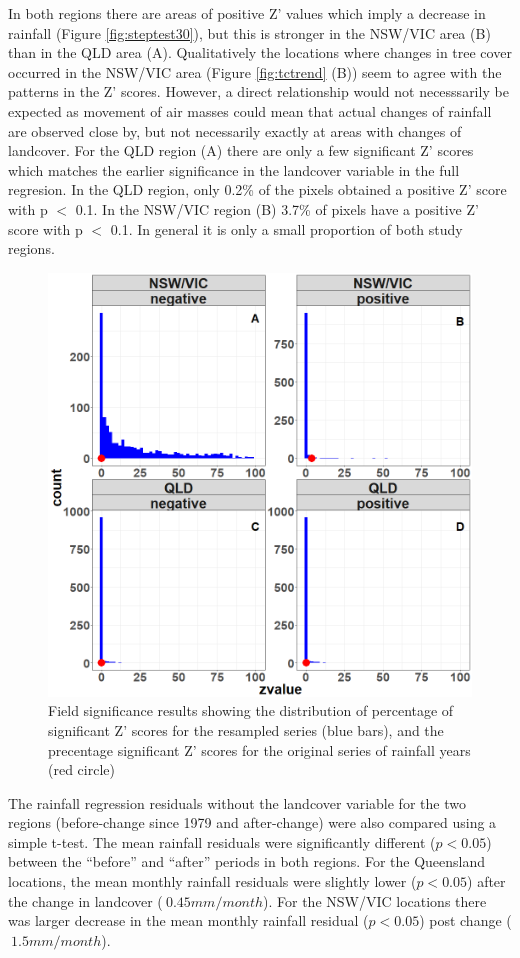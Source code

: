 \documentclass[fleqn,10pt,lineno]{wlpeerj} %
\theoremstyle{definition}
\theoremstyle{definition}
\theoremstyle{definition}
\theoremstyle{remark}
\begin{document}
In both regions there are areas of positive Z' values which imply a
decrease in rainfall (Figure \ref{fig:steptest30}), but this is stronger
in the NSW/VIC area (B) than in the QLD area (A). Qualitatively the
locations where changes in tree cover occurred in the NSW/VIC area
(Figure \ref{fig:tctrend} (B)) seem to agree with the patterns in the Z'
scores. However, a direct relationship would not necesssarily be
expected as movement of air masses could mean that actual changes of
rainfall are observed close by, but not necessarily exactly at areas
with changes of landcover. For the QLD region (A) there are only a few
significant Z' scores which matches the earlier significance in the
landcover variable in the full regresion. In the QLD region, only 0.2\%
of the pixels obtained a positive Z' score with p \(<\) 0.1. In the
NSW/VIC region (B) 3.7\% of pixels have a positive Z' score with p \(<\)
0.1. In general it is only a small proportion of both study regions.

\begin{figure}
\includegraphics[width=0.7\linewidth]{figures/Fig10} \caption{Field significance results showing the distribution of percentage of significant Z' scores for the resampled series (blue bars), and the precentage significant Z' scores for the original series of rainfall years (red circle)}\label{fig:fieldsig}
\end{figure}

The rainfall regression residuals without the landcover variable for the
two regions (before-change since 1979 and after-change) were also
compared using a simple t-test. The mean rainfall residuals were
significantly different (\(p < 0.05\)) between the ``before'' and
``after'' periods in both regions. For the Queensland locations, the
mean monthly rainfall residuals were slightly lower (\(p < 0.05\)) after
the change in landcover (\(~ 0.45 mm/month\)). For the NSW/VIC locations
there was larger decrease in the mean monthly rainfall residual
(\(p < 0.05\)) post change (\(~ 1.5 mm/month\)).
\end{document}
